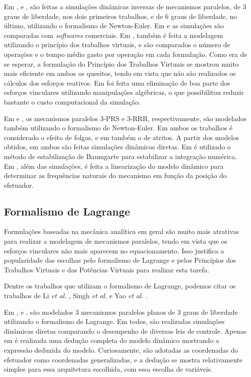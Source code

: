 \documentclass[]{politex}
\begin{document}
Em \cite{Arian}, \cite{LiWang} e \cite{Dasgupta}, são feitas a simulações dinâmicas inversas de mecanismos paralelos, de 3 graus de liberdade, nos dois primeiros trabalhos, e de 6 graus de liberdade, no último, utilizando o formalismo de Newton-Euler. Em \cite{Arian} e \cite{LiWang} as simulações são comparadas com \emph{softwares} comerciais. Em \cite{Arian}, também é feita a modelagem utilizando o princípio dos trabalhos virtuais, e são comparados o número de operações e o tempo médio gasto por operação em cada formulação. Como era de se esperar, a formulação do Princípio dos Trabalhos Virtuais se mostrou muito mais eficiente em ambos os quesitos, tendo em vista que não são realizados os cálculos dos esforços reativos. Em \cite{Dasgupta} foi feita uma eliminação de boa parte dos esforços vinculares utilizando manipulações algébricas, o que possibilitou reduzir bastante o custo computacional da simulação.

Em \cite{Shiau} e \cite{Zhang}, os mecanismos paralelos 3-PRS e 3-RRR, respectivamente, são modelados  também utilizando o formalismo de Newton-Euler. Em ambos os trabalhos é considerado o efeito de folgas, e em \cite{Shiau} também o de atritos. A partir dos modelos obtidos, em ambos são feitas simulações dinâmicas diretas. Em \cite{Zhang} é utilizado o método de estabilização de Baumgarte \cite{Baumgarte} para estabilizar a integração numérica. Em \cite{Shiau}, além das simulações, é feita a linearização do modelo dinâmico para determinar as frequências naturais do mecanismo em função da posição do efetuador.

\subsection{Formalismo de Lagrange}

Formulações baseadas na mecânica analítica em geral são muito mais atrativas para realizar a modelagem de mecanismos paralelos, tendo em vista que os esforços vinculares não mais aparecem no equacionamento. Isso justifica a popularidade das escolhas pelo formalismo de Lagrange e pelos Princípios dos Trabalhos Virtuais e das Potências Virtuais para realizar esta tarefa.

Dentre os trabalhos que utilizam o formalismo de Lagrange, podemos citar os trabalhos de  Li \emph{et al.} \cite{Li3}, Singh \emph{et al.} \cite{Singh, Singh2, Singh3} e Yao \emph{et al.} \cite{Yao}.

Em \cite{Singh}, \cite{Singh2} e \cite{Singh3}, são modelados 3 mecanismos paralelos planos de 3 graus de liberdade utilizando o formalismo de Lagrange. Em todos, são realizadas simulações dinâmicas diretas comparando o desempenho de diversas leis de controle. Apenas em \cite{Singh2} é realizada uma dedução completa do modelo dinâmico mostrando a expressão deduzida do modelo. Curiosamente, são adotadas as coordenadas do efetuador como coordenadas generalizadas, e a dedução se mostra relativamente simples para essa arquitetura escolhida, com essa escolha de variáveis.
\end{document}
